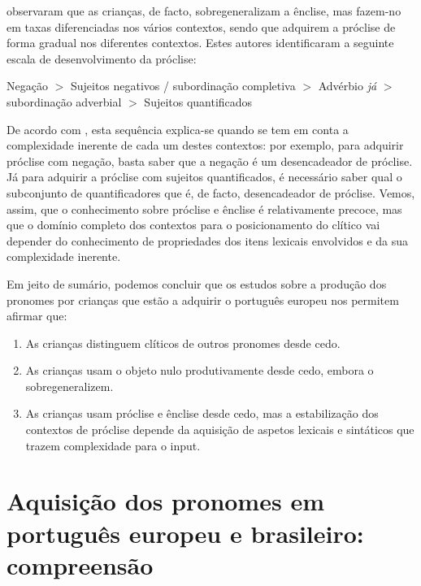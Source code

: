 \documentclass[output=paper]{LSP/langsci}
\begin{document}
\citet{costa_etal2014} observaram que as crianças, de facto, sobregeneralizam a ênclise, mas fazem-no em taxas diferenciadas nos vários contextos, sendo que adquirem a próclise de forma gradual nos diferentes contextos. Estes autores identificaram a seguinte escala de desenvolvimento da próclise:

\ea\label{ex:costa_37}
Negação $>$ Sujeitos negativos / subordinação completiva $>$ Advérbio \textit{já} $>$ subordinação adverbial $>$ Sujeitos quantificados
\z

De acordo com \citet{costa_etal2014}, esta sequência explica-se quando se tem em conta a complexidade inerente de cada um destes contextos: por exemplo, para adquirir próclise com negação, basta saber que a negação é um desencadeador de próclise. Já para adquirir a próclise com sujeitos quantificados, é necessário saber qual o subconjunto de quantificadores que é, de facto, desencadeador de próclise. Vemos, assim, que o conhecimento sobre próclise e ênclise é relativamente precoce, mas que o domínio completo dos contextos para o posicionamento do clítico vai depender do conhecimento de propriedades dos itens lexicais envolvidos e da sua complexidade inerente.

Em jeito de sumário, podemos concluir que os estudos sobre a produção dos pronomes por crianças que estão a adquirir o português europeu nos permitem afirmar que:

\begin{enumerate}[label=\alph*)]
\item As crianças distinguem clíticos de outros pronomes desde cedo.
\item As crianças usam o objeto nulo produtivamente desde cedo, embora o sobregeneralizem.
\item As crianças usam próclise e ênclise desde cedo, mas a estabilização dos contextos de próclise depende da aquisição de aspetos lexicais e sintáticos que trazem complexidade para o input.
\end{enumerate}

\section{Aquisição dos pronomes em português europeu e brasileiro: compreensão}
\label{sec:costa_aquisicao_pb}
\end{document}
